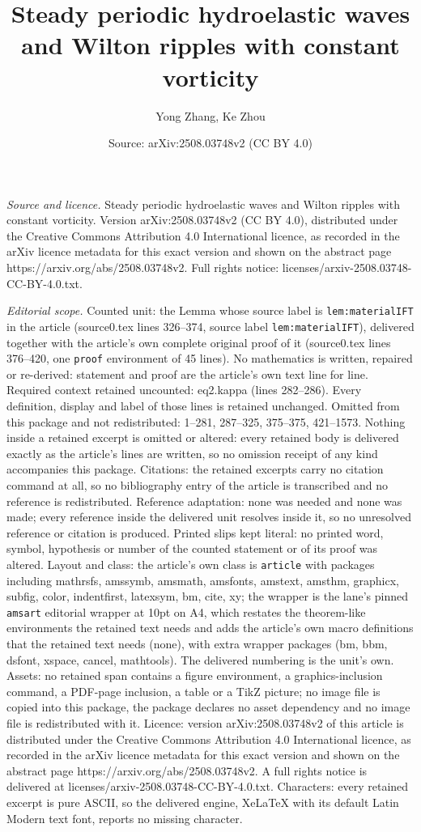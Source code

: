 \documentclass[10pt,a4paper]{amsart}
\title[Steady periodic hydroelastic waves and Wilton ripples with c]{Steady periodic hydroelastic waves and Wilton ripples with constant vorticity}
\author{Yong Zhang, Ke Zhou}
\date{Source: arXiv:2508.03748v2 (CC BY 4.0)}
\begin{document}
\maketitle

\noindent\emph{Source and licence.} Steady periodic hydroelastic waves and Wilton ripples with constant vorticity. Version arXiv:2508.03748v2 (CC BY 4.0), distributed under the Creative Commons Attribution 4.0 International licence, as recorded in the arXiv licence metadata for this exact version and shown on the abstract page https://arxiv.org/abs/2508.03748v2. Full rights notice: licenses/arxiv-2508.03748-CC-BY-4.0.txt.\par\smallskip

\noindent\textit{Editorial scope.} Counted unit: the Lemma whose source label is \texttt{lem:materialIFT} in the article (source0.tex lines 326--374, source label \texttt{lem:materialIFT}), delivered together with the article's own complete original proof of it (source0.tex lines 376--420, one \texttt{proof} environment of 45 lines). No mathematics is written, repaired or re-derived: statement and proof are the article's own text line for line. Required context retained uncounted: eq2.kappa (lines 282--286). Every definition, display and label of those lines is retained unchanged. Omitted from this package and not redistributed: 1--281, 287--325, 375--375, 421--1573. Nothing inside a retained excerpt is omitted or altered: every retained body is delivered exactly as the article's lines are written, so no omission receipt of any kind accompanies this package. Citations: the retained excerpts carry no citation command at all, so no bibliography entry of the article is transcribed and no reference is redistributed. Reference adaptation: none was needed and none was made; every reference inside the delivered unit resolves inside it, so no unresolved reference or citation is produced. Printed slips kept literal: no printed word, symbol, hypothesis or number of the counted statement or of its proof was altered. Layout and class: the article's own class is \texttt{article} with packages including mathrsfs, amssymb, amsmath, amsfonts, amstext, amsthm, graphicx, subfig, color, indentfirst, latexsym, bm, cite, xy; the wrapper is the lane's pinned \texttt{amsart} editorial wrapper at 10pt on A4, which restates the theorem-like environments the retained text needs and adds the article's own macro definitions that the retained text needs (none), with extra wrapper packages (bm, bbm, dsfont, xspace, cancel, mathtools). The delivered numbering is the unit's own. Assets: no retained span contains a figure environment, a graphics-inclusion command, a PDF-page inclusion, a table or a TikZ picture; no image file is copied into this package, the package declares no asset dependency and no image file is redistributed with it. Licence: version arXiv:2508.03748v2 of this article is distributed under the Creative Commons Attribution 4.0 International licence, as recorded in the arXiv licence metadata for this exact version and shown on the abstract page https://arxiv.org/abs/2508.03748v2. A full rights notice is delivered at licenses/arxiv-2508.03748-CC-BY-4.0.txt. Characters: every retained excerpt is pure ASCII, so the delivered engine, XeLaTeX with its default Latin Modern text font, reports no missing character.
\end{document}
